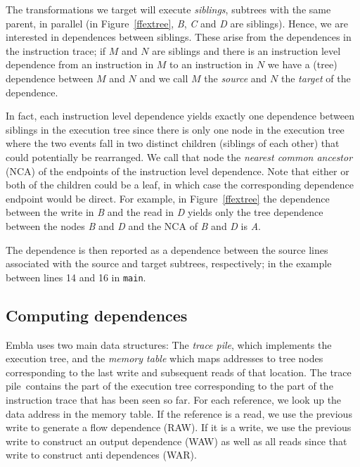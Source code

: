 \documentclass[times, 10pt,twocolumn]{article}
\begin{document}
The transformations we target will execute {\em siblings}, subtrees with
the same parent, in parallel (in Figure~\ref{ffextree}, {\it B}, {\it C} 
and {\it D} are siblings).  Hence, we 
are interested in dependences between siblings. These
arise from the 
dependences in the instruction trace; if $M$ and $N$ are siblings and
there is an instruction level dependence from an instruction in $M$ 
to an instruction in $N$ we have a (tree) dependence between $M$ and $N$
and we call $M$ the {\em source} and $N$ the {\em target} of the dependence.

In fact, each instruction level dependence yields exactly one dependence
between siblings in the execution tree since there is only one node
in the execution tree  
where the two events fall in two distinct children (siblings of each other)
that could potentially be rearranged. We call that node the {\em nearest
common ancestor} (NCA) of the endpoints of the instruction level dependence.
Note that either or both of the children could be a leaf, in which case the
corresponding dependence endpoint would be direct.
For example, in Figure~\ref{ffextree}
the dependence between the write in {\it B} and the read in {\it D} yields
only the tree dependence between the nodes {\it B} and {\it D} and the NCA of
{\it B} and {\it D} is {\it A}. 

The dependence is then reported as a dependence between the source lines
associated with the source and target subtrees, respectively; in the example
between lines 14 and 16 in {\tt main}.

\newcommand{\tracepile}{trace pile}

\subsection{Computing dependences} \label{snca}

Embla uses two main data structures: The {\em \tracepile}, which implements 
the execution tree, and the {\em memory table} which maps addresses to tree
nodes corresponding to the last write and subsequent reads of that
location. The \tracepile\ contains the part of the execution tree
corresponding to the part of the instruction trace that has been
seen so far.
For each reference, we look up the data address in the memory 
table. If the reference is a read, we use the previous write to generate
a flow dependence (RAW). If it is a write, we use the previous write to 
construct an output dependence (WAW) as well as all reads since that 
write to construct anti dependences (WAR).
\end{document}
